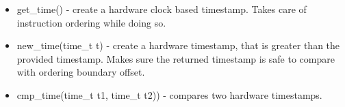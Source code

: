 \begin{itemize}
	\item get\_time() - create a hardware clock based timestamp. Takes care of instruction ordering while doing so.
	\item new\_time(time\_t t) - create a hardware timestamp, that is greater than the provided timestamp. Makes sure the returned 
		timestamp is safe to compare with ordering boundary offset.
	\item cmp\_time(time\_t t1, time\_t t2)) - compares two hardware timestamps. 
\end{itemize}



